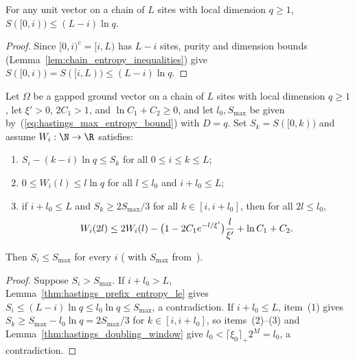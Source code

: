 \begin{lemma}
    \label{thm:hastings_prefix_entropy_le}
    \leanok
    For any unit vector on a chain of $L$ sites with local dimension $q\ge1$,
    $S(\lbrack0,i))\le(L-i)\ln q$.
\end{lemma}
\begin{proof}\leanok
    Since $\lbrack0,i)^c=\lbrack i,L)$ has $L-i$ sites, purity and dimension bounds
    (Lemma~\ref{lem:chain_entropy_inequalities}) give
    $S(\lbrack0,i))=S(\lbrack i,L))\le(L-i)\ln q$.
\end{proof}

\begin{lemma}
    \label{thm:hastings_main_stage}
    \leanok
    Let $\Omega$ be a gapped ground vector on a chain of $L$ sites with local
    dimension $q\ge1$, let $\xi'>0$, $2C_1>1$, and $\ln C_1+C_2\ge0$, and let
    $l_0,S_{\max}$ be given by~(\ref{eq:hastings_max_entropy_bound}) with $D=q$.
    Set $S_k=S([0,k))$ and assume $W_i:\N\to\R$ satisfies:
    \begin{enumerate}
        \item $S_i-(k-i)\ln q\le S_k$ for all $0\le i\le k\le L$;
        \item $0\le W_i(l)\le l\ln q$ for all $l\le l_0$ and $i+l_0\le L$;
        \item if $i+l_0\le L$ and $S_k\ge2S_{\max}/3$ for all $k\in[i,i+l_0]$,
              then for all $2l\le l_0$,
              \begin{align}
                  W_i(2l)\le2W_i(l)-\bigl(1-2C_1e^{-l/\xi'}\bigr)
                  \frac{l}{\xi'}+\ln C_1+C_2.
                  \notag
              \end{align}
    \end{enumerate}
    Then $S_i\le S_{\max}$ for every $i$ (\cite[eq.~(entbd)]{Hastings2007AreaLaw}
    with $S_{\max}$ from~\cite{gap:hastings07_doubling_constants}).
\end{lemma}
\begin{proof}\leanok
    Suppose $S_i>S_{\max}$. If $i+l_0>L$,
    Lemma~\ref{thm:hastings_prefix_entropy_le} gives
    $S_i\le(L-i)\ln q\le l_0\ln q\le S_{\max}$, a contradiction. If
    $i+l_0\le L$, item~(1) gives $S_k\ge S_{\max}-l_0\ln q=2S_{\max}/3$ for
    $k\in[i,i+l_0]$, so items~(2)--(3) and
    Lemma~\ref{thm:hastings_doubling_window} give
    $l_0<\lceil\xi_0\rceil_+2^M=l_0$, a contradiction.
\end{proof}
